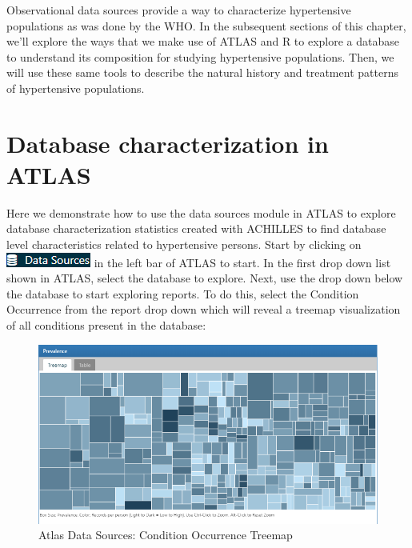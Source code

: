 \documentclass[11pt]{book}
\theoremstyle{definition}
\theoremstyle{definition}
\theoremstyle{definition}
\theoremstyle{remark}
\begin{document}
Observational data sources provide a way to characterize hypertensive populations as was done by the WHO. In the subsequent sections of this chapter, we'll explore the ways that we make use of ATLAS and R to explore a database to understand its composition for studying hypertensive populations. Then, we will use these same tools to describe the natural history and treatment patterns of hypertensive populations.

\hypertarget{database-characterization-in-atlas}{%
\section{Database characterization in ATLAS}\label{database-characterization-in-atlas}}

Here we demonstrate how to use the data sources module in ATLAS to explore database characterization statistics created with ACHILLES to find database level characteristics related to hypertensive persons. Start by clicking on \includegraphics{images/Characterization/atlasDataSourcesMenuItem.png} in the left bar of ATLAS to start. In the first drop down list shown in ATLAS, select the database to explore. Next, use the drop down below the database to start exploring reports. To do this, select the Condition Occurrence from the report drop down which will reveal a treemap visualization of all conditions present in the database:

\begin{figure}

{\centering \includegraphics[width=1\linewidth]{images/Characterization/atlasDataSourcesConditionTreemap} 

}

\caption{Atlas Data Sources: Condition Occurrence Treemap}\label{fig:atlasDataSourcesConditionTreemap}
\end{figure}
\end{document}
